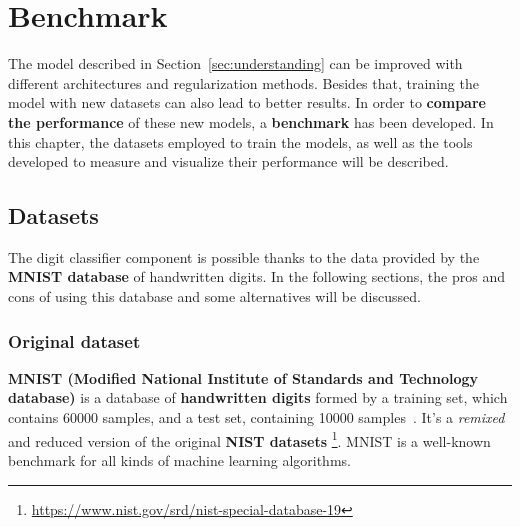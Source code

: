 \chapter{Benchmark}\label{ch:benchmark}
The model described in Section~\ref{sec:understanding} can be improved with different architectures and regularization methods. Besides that, training the model with new datasets can also lead to better results. In order to \textbf{compare the performance} of these new models, a \textbf{benchmark} has been developed. In this chapter, the datasets employed to train the models, as well as the tools developed to measure and visualize their performance will be described.

\section{Datasets}\label{sec:datasets}
The digit classifier component is possible thanks to the data provided by the \textbf{MNIST database} of handwritten digits. In the following sections, the pros and cons of using this database and some alternatives will be discussed.

\subsection{Original dataset}\label{subsec:MNIST}
\textbf{MNIST (Modified National Institute of Standards and Technology database)} is a database of \textbf{handwritten digits} formed by a training set, which contains 60000 samples, and a test set, containing 10000 samples~\cite{lecun-mnisthandwrittendigit-2010}. It's a \textit{remixed} and reduced version of the original \textbf{NIST datasets} \footnote{\url{https://www.nist.gov/srd/nist-special-database-19}}. MNIST is a well-known benchmark for all kinds of machine learning algorithms.

